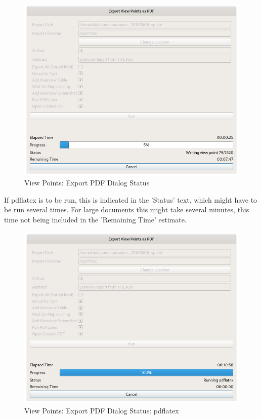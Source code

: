 \begin{figure}[H]
  \centering 
    \includegraphics[width=14cm]{figures/view_points_export_pdf_status.png}
  \caption{View Points: Export PDF Dialog Status}
\end{figure}

If pdflatex is to be run, this is indicated in the 'Status' text, which might have to be run several times. For large documents this might take several minutes, this time not being included in the 'Remaining Time' estimate.

\begin{figure}[H]
  \centering 
    \includegraphics[width=14cm]{figures/view_points_export_pdf_status2.png}
  \caption{View Points: Export PDF Dialog Status: pdflatex}
\end{figure}


